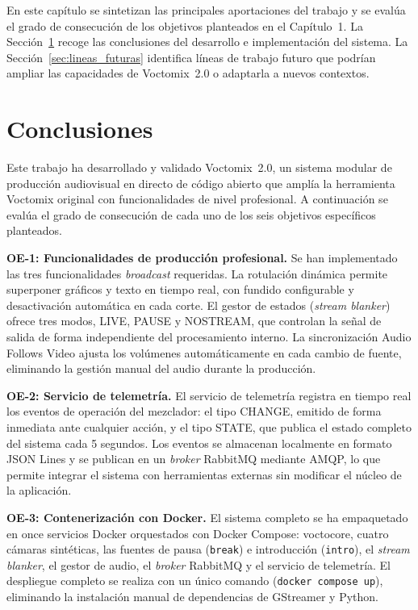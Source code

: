 En este capítulo se sintetizan las principales aportaciones del trabajo y se evalúa el
grado de consecución de los objetivos planteados en el Capítulo~1. La
Sección~\ref{sec:conclusiones} recoge las conclusiones del desarrollo e implementación
del sistema. La Sección~\ref{sec:lineas_futuras} identifica líneas de trabajo futuro
que podrían ampliar las capacidades de Voctomix~2.0 o adaptarla a nuevos contextos.

\section{Conclusiones}
\label{sec:conclusiones}

Este trabajo ha desarrollado y validado Voctomix~2.0, un sistema modular de producción
audiovisual en directo de código abierto que amplía la herramienta Voctomix original
con funcionalidades de nivel profesional. A continuación se evalúa el grado de
consecución de cada uno de los seis objetivos específicos planteados.

\vspace{0.3cm}
\noindent\textbf{OE-1: Funcionalidades de producción profesional.}
Se han implementado las tres funcionalidades \textit{broadcast} requeridas. La rotulación dinámica
permite superponer gráficos y texto en tiempo real, con fundido configurable y
desactivación automática en cada corte. El gestor de estados (\textit{stream blanker}) ofrece
tres modos, LIVE, PAUSE y NOSTREAM, que controlan la señal de salida de forma
independiente del procesamiento interno. La sincronización Audio Follows Video ajusta
los volúmenes automáticamente en cada cambio de fuente, eliminando la gestión manual
del audio durante la producción.

\vspace{0.2cm}
\noindent\textbf{OE-2: Servicio de telemetría.}
El servicio de telemetría registra en tiempo real los eventos de operación del mezclador:
el tipo CHANGE, emitido de forma inmediata ante cualquier acción, y el tipo STATE, que
publica el estado completo del sistema cada 5 segundos. Los eventos se almacenan
localmente en formato JSON Lines y se publican en un \textit{broker} RabbitMQ mediante \acs{AMQP},
lo que permite integrar el sistema con herramientas externas sin modificar el núcleo
de la aplicación.

\vspace{0.2cm}
\noindent\textbf{OE-3: Contenerización con Docker.}
El sistema completo se ha empaquetado en once servicios Docker orquestados con
Docker Compose: voctocore, cuatro cámaras sintéticas, las fuentes de pausa
(\texttt{break}) e introducción (\texttt{intro}), el \textit{stream blanker}, el gestor
de audio, el \textit{broker} RabbitMQ y el servicio de telemetría. El despliegue completo se
realiza con un único comando (\texttt{docker compose up}), eliminando la instalación
manual de dependencias de GStreamer y Python.

